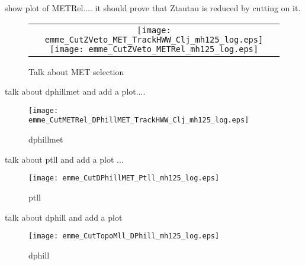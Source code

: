 show plot of METRel.... it should prove that Ztautau is reduced by cutting on it.  

\begin{figure}[!h]
\centering
\begin{tabular}{c}
	\texttt{[image: emme\_CutZVeto\_MET\_TrackHWW\_Clj\_mh125\_log.eps]}
	\texttt{[image: emme\_CutZVeto\_METRel\_mh125\_log.eps]}\\
\end{tabular}
\caption{Talk about MET selection}
\label{fig:met}
\end{figure}

\par 
talk about dphillmet and add a plot....
\begin{figure}[!h]
\centering
	\texttt{[image: emme\_CutMETRel\_DPhillMET\_TrackHWW\_Clj\_mh125\_log.eps]}\\
\caption{dphillmet}
\label{fig:dphillmet}
\end{figure}

\par 
talk about ptll and add a plot ...
\begin{figure}[!h]
\centering
	\texttt{[image: emme\_CutDPhillMET\_Ptll\_mh125\_log.eps]}\\
\caption{ptll}
\label{fig:ptll}
\end{figure}

\par talk about dphill and add a plot
\begin{figure}[!h]
\centering
	\texttt{[image: emme\_CutTopoMll\_DPhill\_mh125\_log.eps]}\\
\caption{dphill}
\label{fig:dphill}
\end{figure}

